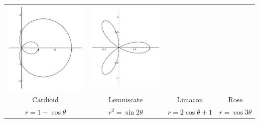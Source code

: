 {{{{{{{\begin{center}
\begin{tabular}{cccc}
\includegraphics[width=\mywidth]{01-Curves-Coordinates-Differentials/limacon}&
\includegraphics[width=\mywidth]{01-Curves-Coordinates-Differentials/rose}
\\
Cardioid&
Lemniscate&
Limacon&
Rose
\\
$r=1-\cos\theta$&
$r^2=\sin 2\theta$&
$r=2\cos\theta+1$&
$r=\cos 3\theta$
\end{tabular}
\end{center}

}}}}}}}
